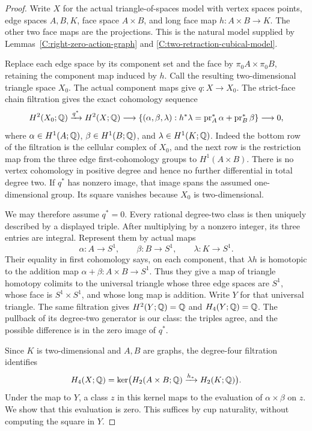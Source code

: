 \begin{proof}
Write $X$ for the actual triangle-of-spaces model with vertex
spaces points, edge spaces $A,B,K$, face space $A\times B$,
and long face map $h:A\times B\to K$.  The other two face
maps are the projections.  This is the natural model supplied
by Lemmas~\ref{C:right-zero-action-graph} and
\ref{C:two-retraction-cubical-model}.

Replace each edge space by its component set and the face by
$\pi_0A\times\pi_0B$, retaining the component map induced by
$h$.  Call the resulting two-dimensional triangle space $X_0$.
The actual component maps give $q:X\to X_0$.  The strict-face
chain filtration gives the exact cohomology sequence
\[
 H^2(X_0;\mathbb Q)\xrightarrow{q^*}H^2(X;\mathbb Q)
 \longrightarrow
 \left\{(\alpha,\beta,\lambda):
 h^*\lambda=\operatorname{pr}_A^*\alpha+
                 \operatorname{pr}_B^*\beta\right\}
 \longrightarrow0,
\]
where $\alpha\in H^1(A;\mathbb Q)$, $\beta\in H^1(B;\mathbb Q)$,
and $\lambda\in H^1(K;\mathbb Q)$.  Indeed the bottom row of the
filtration is the cellular complex of $X_0$, and the next
row is the restriction map from the three edge first-cohomology
groups to $H^1(A\times B)$.  There is no vertex cohomology in positive
degree and hence no further differential in total degree two.
If $q^*$ has nonzero image, that image spans the assumed
one-dimensional group.  Its square vanishes because $X_0$
is two-dimensional.

We may therefore assume $q^*=0$.  Every rational degree-two
class is then uniquely described by a displayed triple.
After multiplying by a nonzero integer, its three entries
are integral.  Represent them by actual maps
\[
 \alpha:A\to S^1,\qquad \beta:B\to S^1,
 \qquad \lambda:K\to S^1.
\]
Their equality in first cohomology says, on each component,
that $\lambda h$ is homotopic to the addition map
$\alpha+\beta:A\times B\to S^1$.  Thus they give a map
of triangle homotopy colimits to the universal triangle
whose three edge spaces are $S^1$, whose face is
$S^1\times S^1$, and whose long map is addition.
Write $Y$ for that universal triangle.  The same filtration
gives $H^2(Y;\mathbb Q)=\mathbb Q$ and $H_4(Y;\mathbb Q)=\mathbb Q$.
The pullback of its degree-two generator is our class:
the triples agree, and the possible difference is in
the zero image of $q^*$.

Since $K$ is two-dimensional and $A,B$ are graphs, the
degree-four filtration identifies
\[
 H_4(X;\mathbb Q)=\ker\bigl(H_2(A\times B;\mathbb Q)
                            \xrightarrow{h_*}H_2(K;\mathbb Q)\bigr).
\]
Under the map to $Y$, a class $z$ in this kernel maps to
the evaluation of $\alpha\times\beta$ on $z$.  We show
that this evaluation is zero.  This suffices by cup
naturality, without computing the square in $Y$.


\end{proof}
